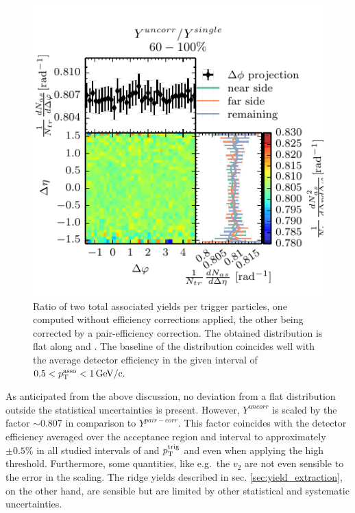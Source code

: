 \begin{figure}
  \centering
  \includegraphics[]{figures/single_track_corr_effect.pdf}
  \caption[Ratio of two total associated yields per trigger particles, one computed without efficiency corrections applied, the other being corrected by a  pair-efficiency correction.]{Ratio of two total associated yields per trigger particles, one computed without efficiency corrections applied, the other being corrected by a  pair-efficiency correction. The obtained distribution is flat along \deta and \dphi. The baseline of the distribution coincides well with the average detector efficiency in the given \ptassoc interval of $0.5 < p_{\text{T}}^{\text{asso}} < \SI{1}{GeV/c}.$}
  \label{fig:effect_single_track_correction}
\end{figure}

As anticipated from the above discussion, no deviation from a flat distribution outside the statistical uncertainties is present. However, $Y^{uncorr}$ is scaled by the factor $\sim 0.807$ in comparison to $Y^{pair-corr}$. This factor coincides with the detector efficiency averaged over the acceptance region and \ptassoc interval to approximately $\pm 0.5\%$ in all studied intervals of \ptassoc and $p_{\text{T}}^{\text{trig}}$ and even when applying the high \pt threshold. Furthermore, some quantities, like e.g.\ the $v_2$ are not even sensible to the error in the scaling. The ridge yields described in sec. \ref{sec:yield_extraction}, on the other hand, are sensible but are limited by other statistical and systematic uncertainties.\\


